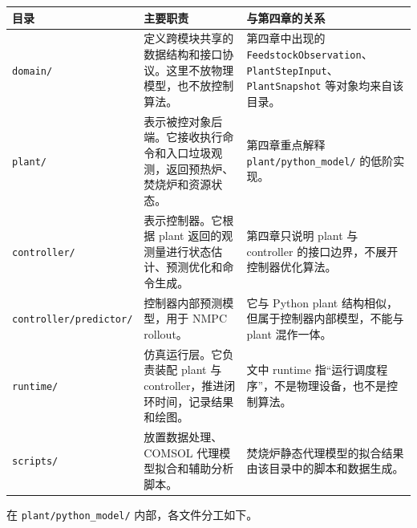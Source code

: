 \documentclass[UTF8,openany,zihao=-4,oneside]{ctexbook}
\providecommand{\passthrough}[1]{#1}
\begin{document}
\begin{longtable}[]{@{}
  >{\raggedright\arraybackslash}p{}
  >{\raggedright\arraybackslash}p{}
  >{\raggedright\arraybackslash}p{}@{}}
\toprule
目录 & 主要职责 & 与第四章的关系 \\
\midrule
\endhead
\bottomrule
\endlastfoot
\passthrough{\lstinline!domain/!} & 定义跨模块共享的数据结构和接口协议。这里不放物理模型，也不放控制算法。 & 第四章中出现的 \passthrough{\lstinline!FeedstockObservation!}、\passthrough{\lstinline!PlantStepInput!}、\passthrough{\lstinline!PlantSnapshot!} 等对象均来自该目录。 \\
\passthrough{\lstinline!plant/!} & 表示被控对象后端。它接收执行命令和入口垃圾观测，返回预热炉、焚烧炉和资源状态。 & 第四章重点解释 \passthrough{\lstinline!plant/python_model/!} 的低阶实现。 \\
\passthrough{\lstinline!controller/!} & 表示控制器。它根据 plant 返回的观测量进行状态估计、预测优化和命令生成。 & 第四章只说明 plant 与 controller 的接口边界，不展开控制器优化算法。 \\
\passthrough{\lstinline!controller/predictor/!} & 控制器内部预测模型，用于 NMPC rollout。 & 它与 Python plant 结构相似，但属于控制器内部模型，不能与 plant 混作一体。 \\
\passthrough{\lstinline!runtime/!} & 仿真运行层。它负责装配 plant 与 controller，推进闭环时间，记录结果和绘图。 & 文中 runtime 指“运行调度程序”，不是物理设备，也不是控制算法。 \\
\passthrough{\lstinline!scripts/!} & 放置数据处理、COMSOL 代理模型拟合和辅助分析脚本。 & 焚烧炉静态代理模型的拟合结果由该目录中的脚本和数据生成。 \\
\end{longtable}

在 \passthrough{\lstinline!plant/python_model/!} 内部，各文件分工如下。
\end{document}
